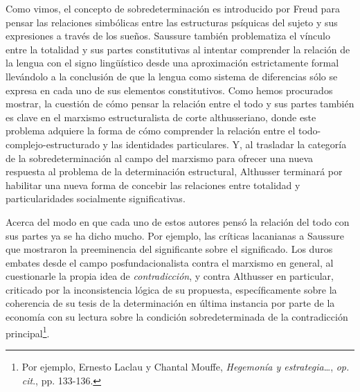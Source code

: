 Como vimos, el concepto de sobredeterminación es introducido por Freud para pensar las relaciones simbólicas entre las estructuras psíquicas del sujeto y sus expresiones a través de los sueños. Saussure también problematiza el vínculo entre la totalidad y sus partes constitutivas al intentar comprender la relación de la lengua con el signo lingüístico desde una aproximación estrictamente formal llevándolo a la conclusión de que la lengua como sistema de diferencias sólo se expresa en cada uno de sus elementos constitutivos. Como hemos procurados mostrar, la cuestión de cómo pensar la relación entre el todo y sus partes también es clave en el marxismo estructuralista de corte althusseriano, donde este problema adquiere la forma de cómo comprender la relación entre el todo-complejo-estructurado y las identidades particulares. Y, al trasladar la categoría de la sobredeterminación al campo del marxismo para ofrecer una nueva respuesta al problema de la determinación estructural, Althusser terminará por habilitar una nueva forma de concebir las relaciones entre totalidad y particularidades socialmente significativas.

Acerca del modo en que cada uno de estos autores pensó la relación del todo con sus partes ya se ha dicho mucho. Por ejemplo, las críticas lacanianas a Saussure que mostraron la preeminencia del significante sobre el significado. Los duros embates desde el campo posfundacionalista contra el marxismo en general, al cuestionarle la propia idea de \emph{contradicción}, y contra Althusser en particular, criticado por la inconsistencia lógica de su propuesta, específicamente sobre la coherencia de su tesis de la determinación en última instancia por parte de la economía con su lectura sobre la condición sobredeterminada de la contradicción principal\footnote{Por ejemplo, Ernesto Laclau y Chantal Mouffe, \emph{Hegemonía y estrategia}\ldots, \emph{op. cit}., pp. 133-136.}.

